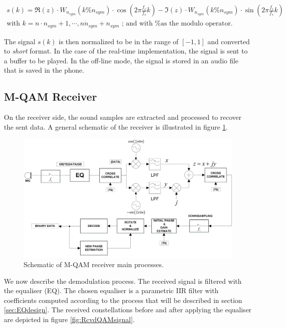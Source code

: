 \documentclass[12pt,a4paper,openright]{report}
\begin{document}
\begin{equation}\begin{array}{l}
s(k) = \Re (z) \cdot {W_{{n_{sym}}}}(k\% {n_{sym}}) \cdot \cos (2\pi \frac{{{f_c}}}{{{f_s}}}k) - \Im (z) \cdot {W_{{n_{sym}}}}(k\% {n_{sym}}) \cdot \sin (2\pi \frac{{{f_c}}}{{{f_s}}}k)\\
\text{with $k = n \cdot n_{sym} + 1,\cdots,n \dot n_{sym}+ n_{sym}$ ; and with \% as the modulo operator.} 
\end{array}\end{equation}

The signal $s(k)$ is then normalized to be in the range of $[-1,1]$ and converted to  \emph{short} format. In the case of the real-time implementation, the signal is sent to a buffer to be played. In the off-line mode, the signal is stored in an audio file that is saved in the phone.

\subsection{M-QAM Receiver}
\label{sub:MQAMrx}
On the receiver side, the sound samples are extracted and processed to recover the sent data. A general schematic of the receiver is illustrated in figure \ref{fig:SchemMQAMrecvr}.

\begin{figure}[h]
  \centering
    \includegraphics[width=1\textwidth]{rcvrSchem.png}
    \caption[Schematic of M-QAM receiver main processes]{Schematic of M-QAM receiver main processes.}
    \label{fig:SchemMQAMrecvr}
\end{figure}


We now describe the demodulation process. The received signal is filtered with the equaliser (EQ). The chosen equaliser is a parametric IIR filter with coefficients computed according to the process that will be described in section \ref{sec:EQdesign}. The received constellations before and after applying the equaliser are depicted in figure \ref{fig:RcvdQAMsignal}.
 
\end{document}
